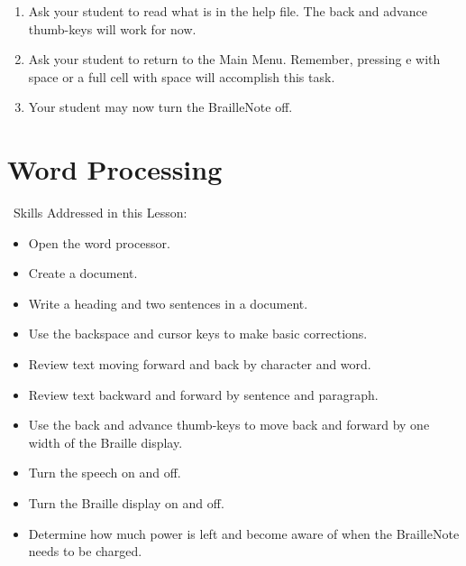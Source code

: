 \documentclass[10pt,letterpaper,twoside]{report}
\begin{document}
{{{\begin{enumerate}
	\item Ask your student to read what is in the help file.  The back and advance thumb-keys will work for now.
	\item Ask your student to return to the Main Menu.  Remember, pressing e with space or a full cell with space will accomplish this task.
	\item Your student may now turn the BrailleNote off.
\end{enumerate}
\clearpage
\section{ Word Processing}
\
Skills Addressed in this Lesson:
\begin{itemize}
	\item Open the word processor.
	\item Create a document.
	\item Write a heading and two sentences in a document.
	\item Use the backspace and cursor keys to make basic corrections.
	\item Review text moving forward and back by character and word.
	\item Review text backward and forward by sentence and paragraph.
	\item Use the back and advance thumb-keys to move back and forward by one width of the Braille display.
	\item Turn the speech on and off.
	\item Turn the Braille display on and off.
	\item Determine how much power is left and become aware of when the BrailleNote needs to be charged.
\end{itemize}
}}}
\end{document}
